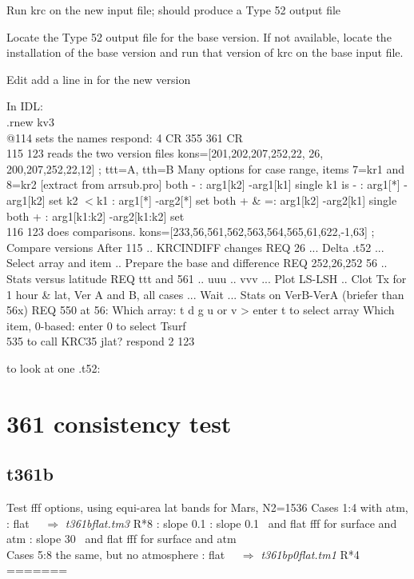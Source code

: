 \documentclass{article}
\newcommand{\qfo}[1]{$\Longrightarrow$ \textit{#1}} %
\begin{document}
Run krc on the new input file; should produce a Type 52 output file 

Locate the Type 52 output file for the base version. If not available, locate the installation of the base version and run that version of krc on the base input file.


Edit 
\qi add a line in  for the new version


In IDL:  
\\ .rnew kv3
\\ @114    sets the names
\qi  respond:  4 CR  355 361  CR 
\\ 115 123 reads the two version files 
\qii kons=[201,202,207,252,22, 26, 200,207,252,22,12] ; ttt=A, tth=B
\qi Many options for case range, items 7=kr1 and 8=kr2  [extract from arrsub.pro] 
\qiii  both -  :    arg1[k2]    -arg1[k1]    single 
\qiii  k1 is - :    arg1[*]     -arg1[k2]    set
\qiii  k2 $<$k1  :    arg1[*]     -arg2[*]     set
\qiii  both + \& =:  arg1[k2]    -arg2[k1]    single
\qiii  both +   :   arg1[k1:k2] -arg2[k1:k2] set
\\ 116 123 does comparisons.
\qi kons=[233,56,561,562,563,564,565,61,622,-1,63] ; Compare versions After 115
.. KRCINDIFF changes REQ 26 
... Delta .t52
... Select array and item
.. Prepare the base and difference   REQ 252,26,252  56
.. Stats versus latitude  REQ ttt and 561
.. uuu
.. vvv
... Plot LS-LSH
.. Clot Tx for 1 hour \& lat, Ver A and B, all cases
... Wait
... Stats on VerB-VerA (briefer than 56x) REQ 550
\qi at 56: Which array: t d g u or v >  enter t to select   array
\qii Which item, 0-based:  enter 0 to select Tsurf
\\ 535 to call KRC35
\qi jlat? respond   2
 123

to look at one .t52: 

\section{361 consistency test}

\subsection{t361b} %
Test fff options, using equi-area lat bands for Mars, N2=1536
Cases 1:4 with atm,
: flat  \ \ \qfo{t361bflat.tm3} R*8
: slope 0.1\qd
{}:  slope 0.1\qd~ and flat fff for surface and atm
:  slope 30\qd~ and flat fff for surface and atm
\\ Cases 5:8 the same, but no atmosphere
: flat  \ \ \qfo{t361bp0flat.tm1} R*4
=======
\end{document}
